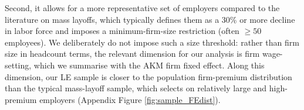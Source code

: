 
Second, it allows for a more representative set of employers compared to the literature on mass layoffs, which typically defines them as a 30\% or more decline in labor force \citep[e.g.][]{Jacobson1993,Gathmann2018,Gulyas2019,Lachowska2020,Schmieder2020} and imposes a minimum-firm-size restriction (often $\geq 50$ employees). We deliberately do not impose such a size threshold: rather than firm size in headcount terms, the relevant dimension for our analysis is firm wage-setting, which we summarise with the AKM firm fixed effect. Along this dimension, our LE sample is closer to the population firm-premium distribution than the typical mass-layoff sample, which selects on relatively large and high-premium employers (Appendix Figure \ref{fig:sample_FEdist}).

